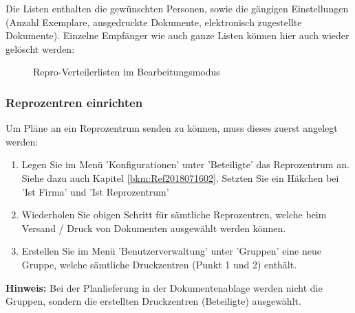 Die Listen enthalten die gewünschten Personen, sowie die gängigen Einstellungen (Anzahl Exemplare, ausgedruckte Dokumente, elektronisch zugestellte Dokumente). Einzelne Empfänger wie auch ganze Listen können hier auch wieder gelöscht werden:

\begin{figure}[H]
\caption{Repro-Verteilerlisten im Bearbeitungsmodus}
\end{figure}

\subsubsection{Reprozentren einrichten}
\label{bkm:Ref2018071601}

Um Pläne an ein Reprozentrum senden zu können, muss dieses zuerst angelegt werden:

\begin{enumerate}
\item Legen Sie im Menü 'Konfigurationen' unter 'Beteiligte' das Reprozentrum an. Siehe dazu auch Kapitel \ref{bkm:Ref2018071602}. Setzten Sie ein Häkchen bei 'Ist Firma' und 'Ist Reprozentrum'
\item Wiederholen Sie obigen Schritt für sämtliche Reprozentren, welche beim Versand / Druck von Dokumenten ausgewählt werden können.
\item Erstellen Sie im Menü 'Benutzerverwaltung' unter 'Gruppen' eine neue Gruppe, welche sämtliche Druckzentren (Punkt 1 und 2) enthält.
\end{enumerate}

\textbf{Hinweis:} Bei der Planlieferung in der Dokumentenablage werden nicht die Gruppen, sondern die erstellten Druckzentren (Beteiligte) ausgewählt.




